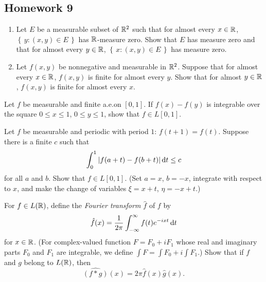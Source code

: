\subsection{Homework 9}
\begin{problem}
\begin{enumerate}[label=(\alph*),noitemsep]
\item Let $E$ be a measurable subset of $\mathbb{R}^2$ such that for almost every
  $x\in\mathbb{R}$, $\left\{\,y:(x,y)\in E\,\right\}$ has
  $\mathbb{R}$-measure zero. Show that $E$ has measure zero and that for almost
  every $y\in\mathbb{R}$, $\left\{\,x:(x,y)\in E\,\right\}$ has
  measure zero.
\item Let $f(x,y)$ be nonnegative and measurable in $\mathbb{R}^2$. Suppose that
  for almost every $x\in\mathbb{R}$, $f(x,y)$ is finite for almost every
  $y$. Show that for almost $y\in\mathbb{R}$, $f(x,y)$ is finite for almost
  every $x$.
\end{enumerate}
\end{problem}
\begin{solution}
\end{solution}

\begin{problem}
Let $f$ be measurable and finite a.e.\@ on $[0,1]$. If $f(x)-f(y)$ is
integrable over the square $0\leq x\leq 1$, $0\leq y\leq 1$, show that
$f\in L[0,1]$.
\end{problem}
\begin{solution}
\end{solution}

\begin{problem}
Let $f$ be measurable and periodic with period $1$: $f(t+1)=f(t)$. Suppose
there is a finite $c$ such that
\[
\int_0^1|f(a+t)-f(b+t)|\mathop{}\!\mathrm{d} t\leq c
\]
for all $a$ and $b$. Show that $f\in L[0,1]$. (Set $a=x$, $b=-x$, integrate
with respect to $x$, and make the change of variables $\xi=x+t$,
$\eta=-x+t$.)
\end{problem}
\begin{solution}
\end{solution}

\begin{problem}
For $f\in L(\mathbb{R})$, define the \emph{Fourier transform $\hat f$} of $f$
by
\[
\hat f(x)=\frac{1}{2\pi}\int_{-\infty}^\infty f(t)e^{-ixt}\mathop{}\!\mathrm{d} t
\]
for $x\in\mathbb{R}$. (For complex-valued function $F=F_0+iF_1$ whose real and
imaginary parts $F_0$ and $F_1$ are integrable, we define $\int F=\int
F_0+i\int F_1$.) Show that if $f$ and $g$ belong to $L(\mathbb{R})$, then
\[
\widehat{(f*g)}(x)=2\pi\hat f(x)\hat g(x).
\]
\end{problem}
\begin{solution}
\end{solution}

